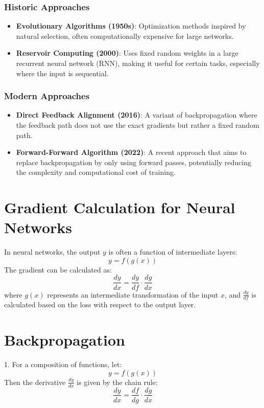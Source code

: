 \documentclass{article}
\begin{document}
\subsubsection{Historic Approaches}
\begin{itemize}
    \item \textbf{Evolutionary Algorithms (1950s)}\cite{evolutionary_algorithms}: Optimization methods inspired by natural selection, often computationally expensive for large networks.
    \item \textbf{Reservoir Computing (2000)}\cite{dong2020reservoir}: Uses fixed random weights in a large recurrent neural network (RNN), making it useful for certain tasks, especially where the input is sequential.
\end{itemize}

\subsubsection{Modern Approaches}
\begin{itemize}
    \item \textbf{Direct Feedback Alignment (2016)}\cite{nokland2016dfa}: A variant of backpropagation where the feedback path does not use the exact gradients but rather a fixed random path.
    \item \textbf{Forward-Forward Algorithm (2022)}\cite{hinton2022forward}: A recent approach that aims to replace backpropagation by only using forward passes, potentially reducing the complexity and computational cost of training.
\end{itemize}

\section{Gradient Calculation for Neural Networks}
In neural networks, the output \( y \) is often a function of intermediate layers:
\[
y = f(g(x))
\]
The gradient can be calculated as:
\[
\frac{dy}{dx} = \frac{dy}{df} \cdot \frac{dg}{dx}
\]
where \( g(x) \) represents an intermediate transformation of the input \( x \), and \( \frac{dy}{df} \) is calculated based on the loss with respect to the output layer.


\section{Backpropagation}

1. For a composition of functions, let:
   \[
   y = f(g(x))
   \]
   Then the derivative \( \frac{dy}{dx} \) is given by the chain rule:
   \[
   \frac{dy}{dx} = \frac{df}{dg} \cdot \frac{dg}{dx}
   \]
\end{document}
